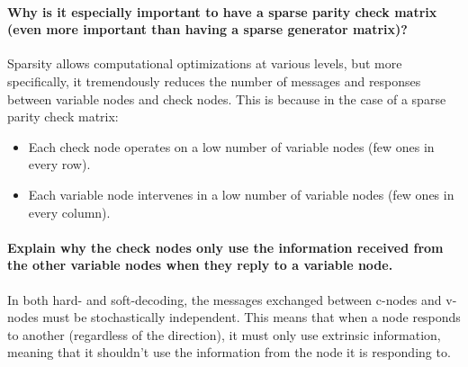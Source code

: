 \paragraph{Why is it especially important to have a sparse parity check matrix (even more important
than having a sparse generator matrix)?}
Sparsity allows computational optimizations at various levels, but more specifically, it tremendously reduces the number of messages and responses between variable nodes and check nodes. This is because in the case of a sparse parity check matrix:
\begin{itemize}
  \item Each check node operates on a low number of variable nodes (few ones in every row).
  \item Each variable node intervenes in a low number of variable nodes (few ones in every column).
\end{itemize}

\paragraph{Explain why the check nodes only use the information received from the other variable
nodes when they reply to a variable node.}
In both hard- and soft-decoding, the messages exchanged between c-nodes and v-nodes must be stochastically independent. This means that when a node responds to another (regardless of the direction), it must only use extrinsic information, meaning that it shouldn't use the information from the node it is responding to.
